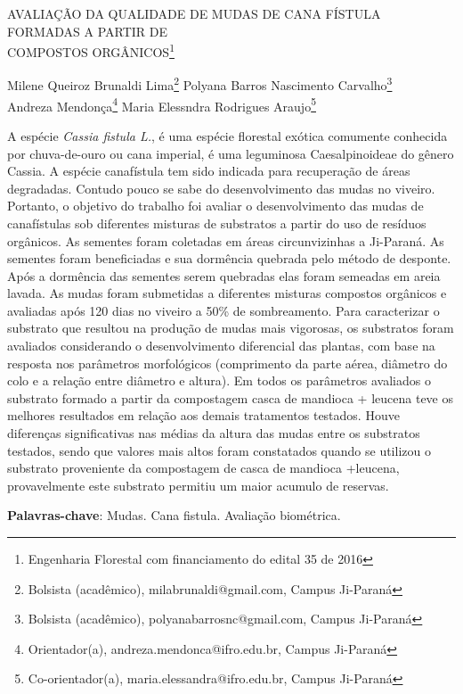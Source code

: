 \documentclass[article,12pt,onesidea,4paper,english,brazil]{abntex2}
\begin{document}
	
	
	\frenchspacing 
	
	\begin{center}
		\LARGE AVALIAÇÃO DA QUALIDADE DE MUDAS DE CANA FÍSTULA FORMADAS A PARTIR DE\\COMPOSTOS ORGÂNICOS\footnote{Engenharia Florestal com financiamento do edital 35 de 2016}
		
		\normalsize
		Milene Queiroz Brunaldi Lima\footnote{Bolsista (acadêmico), milabrunaldi@gmail.com, Campus Ji-Paraná} 
		Polyana Barros Nascimento Carvalho\footnote{Bolsista (acadêmico), polyanabarrosnc@gmail.com, Campus Ji-Paraná} \\
		Andreza Mendonça\footnote{Orientador(a), andreza.mendonca@ifro.edu.br, Campus Ji-Paraná} 
	Maria Elessndra Rodrigues Araujo\footnote{Co-orientador(a), maria.elessandra@ifro.edu.br, Campus Ji-Paraná} 
	\end{center}
	
	\noindent A espécie \textit{Cassia fistula L.}, é uma espécie florestal exótica comumente conhecida
	por chuva-de-ouro ou cana imperial, é uma leguminosa Caesalpinoideae do gênero
	Cassia. A espécie canafístula tem sido indicada para recuperação de áreas
	degradadas. Contudo pouco se sabe do desenvolvimento das mudas no viveiro.
	Portanto, o objetivo do trabalho foi avaliar o desenvolvimento das mudas de
	canafístulas sob diferentes misturas de substratos a partir do uso de resíduos
	orgânicos. As sementes foram coletadas em áreas circunvizinhas a Ji-Paraná. As
	sementes foram beneficiadas e sua dormência quebrada pelo método de desponte.
	Após a dormência das sementes serem quebradas elas foram semeadas em areia
	lavada. As mudas foram submetidas a diferentes misturas compostos orgânicos e
	avaliadas após 120 dias no viveiro a 50\% de sombreamento. Para caracterizar o
	substrato que resultou na produção de mudas mais vigorosas, os substratos foram
	avaliados considerando o desenvolvimento diferencial das plantas, com base na
	resposta nos parâmetros morfológicos (comprimento da parte aérea, diâmetro do
	colo e a relação entre diâmetro e altura). Em todos os parâmetros avaliados o
	substrato formado a partir da compostagem casca de mandioca + leucena teve os
	melhores resultados em relação aos demais tratamentos testados. Houve diferenças
	significativas nas médias da altura das mudas entre os substratos testados, sendo
	que valores mais altos foram constatados quando se utilizou o substrato proveniente
	da compostagem de casca de mandioca +leucena, provavelmente este substrato
	permitiu um maior acumulo de reservas.
	
	\vspace{\onelineskip}
	
	\noindent
	\textbf{Palavras-chave}: Mudas. Cana fistula. Avaliação biométrica.
	
\end{document}
